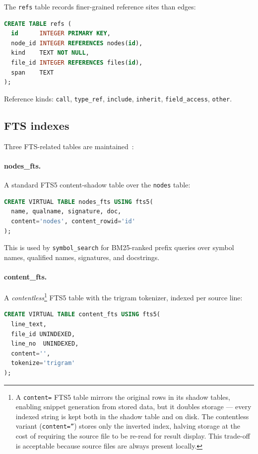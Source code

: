 The \texttt{refs} table records finer-grained reference sites than edges:

\begin{lstlisting}[language=sql]
CREATE TABLE refs (
  id      INTEGER PRIMARY KEY,
  node_id INTEGER REFERENCES nodes(id),
  kind    TEXT NOT NULL,
  file_id INTEGER REFERENCES files(id),
  span    TEXT
);
\end{lstlisting}

Reference kinds: \texttt{call}, \texttt{type\_ref}, \texttt{include},
\texttt{inherit}, \texttt{field\_access}, \texttt{other}.

\subsection{FTS indexes}

Three FTS-related tables are maintained~\cite{hipp2014fts5}:

\paragraph{nodes\_fts.}  A standard FTS5 content-shadow table over the
\texttt{nodes} table:

\begin{lstlisting}[language=sql]
CREATE VIRTUAL TABLE nodes_fts USING fts5(
  name, qualname, signature, doc,
  content='nodes', content_rowid='id'
);
\end{lstlisting}

This is used by \texttt{symbol\_search} for BM25-ranked prefix queries over
symbol names, qualified names, signatures, and docstrings.

\paragraph{content\_fts.}  A \emph{contentless}\footnote{A \texttt{content=}
FTS5 table mirrors the original rows in its shadow tables, enabling
snippet generation from stored data, but it doubles storage --- every indexed
string is kept both in the shadow table and on disk. The contentless variant
(\texttt{content=''}) stores only the inverted index, halving storage at the
cost of requiring the source file to be re-read for result display. This
trade-off is acceptable because source files are always present locally.}
FTS5 table with the trigram
tokenizer, indexed per source line:

\begin{lstlisting}[language=sql]
CREATE VIRTUAL TABLE content_fts USING fts5(
  line_text,
  file_id UNINDEXED,
  line_no  UNINDEXED,
  content='',
  tokenize='trigram'
);
\end{lstlisting}

